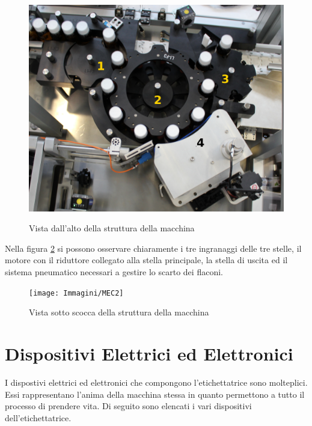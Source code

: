 \documentclass[12pt, a4paper, oneside]{book}
\begin{document}
\begin{figure}[H]
	\centering
	\includegraphics[width=12cm]{Immagini/MEC1}
	\label{mec1}
	\caption{ Vista dall'alto della struttura della macchina}
\end{figure}

Nella figura \ref{mec2} si possono osservare chiaramente i tre ingranaggi delle tre stelle, il motore con il riduttore collegato alla stella principale, la stella di uscita ed il sistema pneumatico necessari a gestire lo scarto dei flaconi.

\begin{figure}[H]
	\centering
	\texttt{[image: Immagini/MEC2]}
	\label{mec2}
	\caption{ Vista sotto scocca della struttura della macchina}
\end{figure}


\section{Dispositivi Elettrici ed Elettronici}
I dispostivi elettrici ed elettronici che compongono l'etichettatrice sono molteplici. Essi rappresentano l'anima della macchina stessa in quanto permettono a tutto il processo di prendere vita.
Di seguito sono elencati i vari dispositivi dell'etichettatrice.
\end{document}
